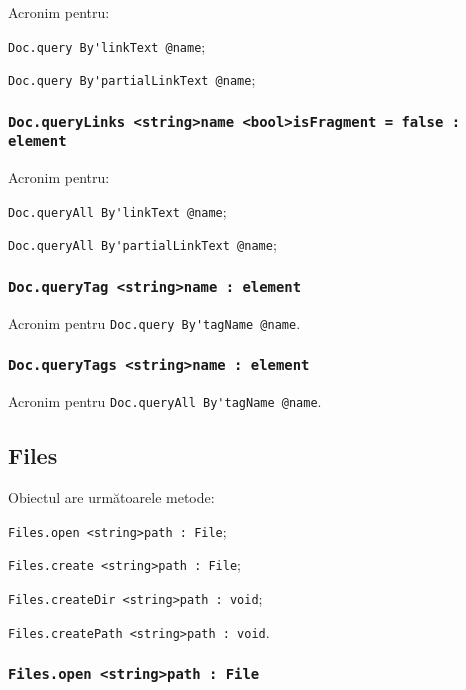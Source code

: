 Acronim pentru:
\begin{icItems}
	\item \lstinline|Doc.query By'linkText @name|;
	\item \lstinline|Doc.query By'partialLinkText @name|;
\end{icItems}

\subsubsection{\lstinline|Doc.queryLinks <string>name <bool>isFragment = false : element|}

Acronim pentru:
\begin{icItems}
	\item \lstinline|Doc.queryAll By'linkText @name|;
	\item \lstinline|Doc.queryAll By'partialLinkText @name|;
\end{icItems}

\subsubsection{\lstinline|Doc.queryTag <string>name : element|}

Acronim pentru \lstinline|Doc.query By'tagName @name|.

\subsubsection{\lstinline|Doc.queryTags <string>name : element|}

Acronim pentru \lstinline|Doc.queryAll By'tagName @name|.

\subsection{{\color{orange} Files}}

Obiectul \files{} are următoarele metode:
\begin{icItems}
	\item \lstinline|Files.open <string>path : File|;
	\item \lstinline|Files.create <string>path : File|;
	\item \lstinline|Files.createDir <string>path : void|;
	\item \lstinline|Files.createPath <string>path : void|.
\end{icItems}

\subsubsection{\lstinline|Files.open <string>path : File|}

